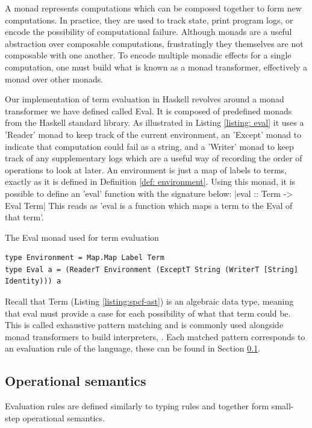 \documentclass[12pt,a4paper]{report}
\theoremstyle{definition}
\theoremstyle{definition}
\theoremstyle{remark}
\begin{document}
A monad represents computations which can be composed together to form new computations. In practice, they are used to track state, print program logs, or encode the possibility of computational failure. Although monads are a useful abstraction over composable computations, frustratingly they themselves are not composable with one another. To encode multiple monadic effects for a single computation, one must build what is known as a monad transformer, effectively a monad over other monads.

Our implementation of term evaluation in Haskell revolves around a monad transformer we have defined called Eval. It is composed of predefined monads from the Haskell standard library. As illustrated in Listing \ref{listing: eval} it uses a 'Reader' monad to keep track of the current environment, an 'Except' monad to indicate that computation could fail as a string, and a 'Writer' monad to keep track of any supplementary logs which are a useful way of recording the order of operations to look at later. An environment is just a map of labels to terms, exactly as it is defined in Definition \ref{def: environment}. Using this monad, it is possible to define an 'eval' function with the signature below:
|eval :: Term -> Eval Term|
This reads as 'eval is a function which maps a term to the Eval of that term'. 

\begin{listing}
\caption{The Eval monad used for term evaluation}
\begin{verbatim}
type Environment = Map.Map Label Term
type Eval a = (ReaderT Environment (ExceptT String (WriterT [String] Identity))) a
\end{verbatim}
\label{listing: eval}
\end{listing}

Recall that Term (Listing \ref{listing:spcf-ast}) is an algebraic data type, meaning that eval must provide a case for each possibility of what that term could be. This is called exhaustive pattern matching and is commonly used alongside monad transformers to build interpreters, \citep[\emph{e.g.},][]{Liang1995MonadTA}. Each matched pattern corresponds to an evaluation rule of the language, these can be found in Section \ref{section: op sem}.

\subsection{Operational semantics}\label{section: op sem}
Evaluation rules are defined similarly to typing rules and together form small-step operational semantics.
\end{document}
